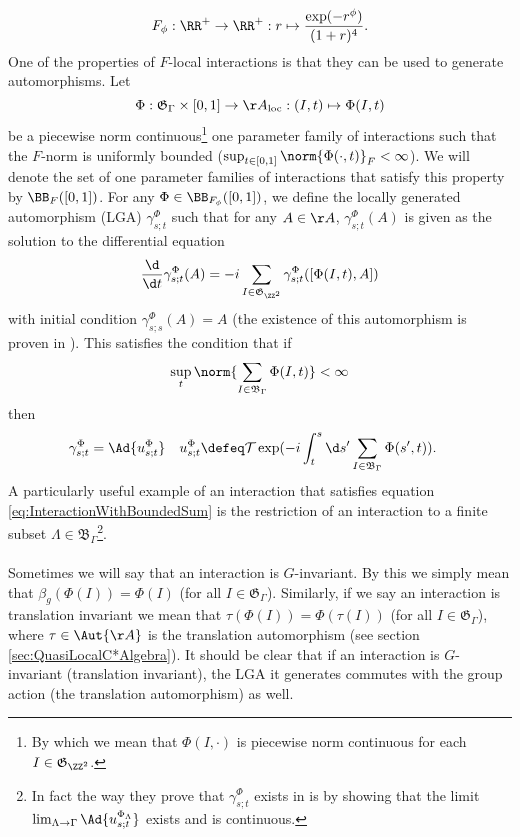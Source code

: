 \begin{equation}\label{eq:OurFFunction}
F_\phi:\RR^+\rightarrow\RR^+:r\mapsto \frac{\exp(-r^\phi)}{(1+r)^4}.
\end{equation}
One of the properties of $F$-local interactions is that they can be used to generate automorphisms. Let
\begin{equation}
\Phi:\mathfrak{G}_{\Gamma}\times [0,1]\rightarrow \AA_{\text{loc}}:(I,t)\mapsto \Phi(I,t)
\end{equation}
be a piecewise norm continuous\footnote{By which we mean that $\Phi(I,\cdot)$ is piecewise norm continuous for each $I\in\mathfrak{G}_{\ZZ^2}$.} one parameter family of interactions such that the $F$-norm is uniformly bounded ($\sup_{t\in[0,1]}\norm{\Phi(\cdot,t)}_F<\infty$). We will denote the set of one parameter families of interactions that satisfy this property by $\BB_{F}([0,1])$. For any $\Phi\in\BB_{F_\phi}([0,1])$, we define the locally generated automorphism (LGA) $\gamma^{\Phi}_{s;t}$ such that for any $A\in\AA$, $\gamma^{\Phi}_{s;t}(A)$ is given as the solution to the differential equation
\begin{equation}
\frac{\d}{\d t}\gamma^{\Phi}_{s;t}(A)=-i\sum_{I\in\mathfrak{G}_{\ZZ^2}}\gamma^{\Phi}_{s;t}([\Phi(I,t),A])
\end{equation}
with initial condition $\gamma^{\Phi}_{s;s}(A)=A$ (the existence of this automorphism is proven in \cite{nachtergaele2019quasi}). This satisfies the condition that if
\begin{equation}\label{eq:InteractionWithBoundedSum}
\sup_t\norm{\sum_{I\in\mathfrak{B}_{\Gamma}}\Phi(I,t)}<\infty
\end{equation}
then
\begin{align}
\gamma^\Phi_{s;t}&=\Ad{u^\Phi_{s;t}}&u^\Phi_{s;t}&\defeq\mathcal{T}\exp(-i\int_t^s\d s'\sum_{I\in\mathfrak{B}_{\Gamma}}\Phi(s',t)).
\end{align}
A particularly useful example of an interaction that satisfies equation \eqref{eq:InteractionWithBoundedSum} is the restriction of an interaction to a finite subset $\Lambda\in\mathfrak{B}_\Gamma$\footnote{In fact the way they prove that $\gamma^\Phi_{s;t}$ exists in \cite{nachtergaele2019quasi} is by showing that the limit $\lim_{\Lambda\rightarrow\Gamma}\Ad{u^{\Phi_\Lambda}_{s;t}}$ exists and is continuous.}.\\\\
Sometimes we will say that an interaction is $G$-invariant. By this we simply mean that $\beta_g(\Phi(I))=\Phi(I)$ (for all $I\in\mathfrak{G}_{\Gamma}$). Similarly, if we say an interaction is translation invariant we mean that $\tau(\Phi(I))=\Phi(\tau(I))$ (for all $I\in\mathfrak{G}_{\Gamma}$), where $\tau\in\Aut{\AA}$ is the translation automorphism (see section \ref{sec:QuasiLocalC*Algebra}). It should be clear that if an interaction is $G$-invariant (translation invariant), the LGA it generates commutes with the group action (the translation automorphism) as well.
